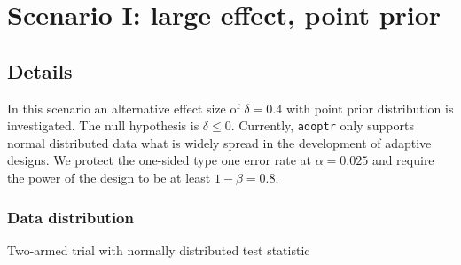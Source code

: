 \documentclass[]{book}
\newenvironment{Shaded}{\begin{snugshade}}{\end{snugshade}}
\newcommand{\CharTok}[1]{\textcolor[rgb]{0.31,0.60,0.02}{#1}}
\newcommand{\CommentTok}[1]{\textcolor[rgb]{0.56,0.35,0.01}{\textit{#1}}}
\newcommand{\ControlFlowTok}[1]{\textcolor[rgb]{0.13,0.29,0.53}{\textbf{#1}}}
\newcommand{\DataTypeTok}[1]{\textcolor[rgb]{0.13,0.29,0.53}{#1}}
\newcommand{\DecValTok}[1]{\textcolor[rgb]{0.00,0.00,0.81}{#1}}
\newcommand{\FloatTok}[1]{\textcolor[rgb]{0.00,0.00,0.81}{#1}}
\newcommand{\KeywordTok}[1]{\textcolor[rgb]{0.13,0.29,0.53}{\textbf{#1}}}
\newcommand{\NormalTok}[1]{#1}
\newcommand{\StringTok}[1]{\textcolor[rgb]{0.31,0.60,0.02}{#1}}
\begin{document}
\begin{Shaded}
\end{Shaded}

\hypertarget{scenarioI}{%
\chapter{Scenario I: large effect, point prior}\label{scenarioI}}

\hypertarget{details}{%
\section{Details}\label{details}}

In this scenario an alternative effect size of \(\delta = 0.4\) with
point prior distribution is investigated.
The null hypothesis is \(\delta \leq 0\).
Currently, \texttt{adoptr} only supports normal distributed data what is widely spread
in the development of adaptive designs.
We protect the one-sided type one error rate at \(\alpha = 0.025\) and require
the power of the design to be at least \(1 - \beta = 0.8\).

\hypertarget{data-distribution}{%
\subsection{Data distribution}\label{data-distribution}}

Two-armed trial with normally distributed test statistic
\end{document}
